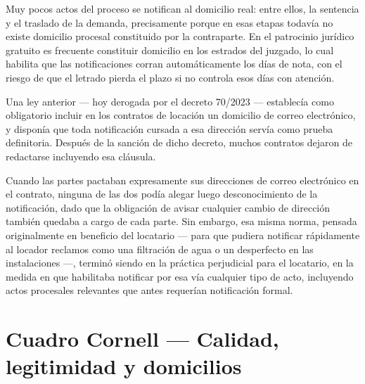 \documentclass[12pt,oneside]{book}
\begin{document}
Muy pocos actos del proceso se notifican al domicilio real: entre ellos, la sentencia y el traslado de la demanda, precisamente porque en esas etapas todavía no existe domicilio procesal constituido por la contraparte. En el patrocinio jurídico gratuito es frecuente constituir domicilio en los estrados del juzgado, lo cual habilita que las notificaciones corran automáticamente los días de nota, con el riesgo de que el letrado pierda el plazo si no controla esos días con atención.

\begin{note}
Una ley anterior --- hoy derogada por el decreto 70/2023 --- establecía como obligatorio incluir en los contratos de locación un domicilio de correo electrónico, y disponía que toda notificación cursada a esa dirección servía como prueba definitoria. Después de la sanción de dicho decreto, muchos contratos dejaron de redactarse incluyendo esa cláusula.
\end{note}

Cuando las partes pactaban expresamente sus direcciones de correo electrónico en el contrato, ninguna de las dos podía alegar luego desconocimiento de la notificación, dado que la obligación de avisar cualquier cambio de dirección también quedaba a cargo de cada parte. Sin embargo, esa misma norma, pensada originalmente en beneficio del locatario --- para que pudiera notificar rápidamente al locador reclamos como una filtración de agua o un desperfecto en las instalaciones ---, terminó siendo en la práctica perjudicial para el locatario, en la medida en que habilitaba notificar por esa vía cualquier tipo de acto, incluyendo actos procesales relevantes que antes requerían notificación formal.


\section*{Cuadro Cornell --- Calidad, legitimidad y domicilios}
\end{document}
